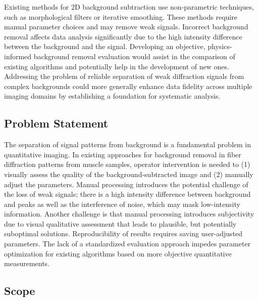 \documentclass[iucr,review]{iucrjournals}
\begin{document}
Existing methods for 2D background subtraction use non-parametric techniques,
such as morphological filters or iterative smoothing.
These methods require manual parameter choices and may remove weak signals.
Incorrect background removal affects data analysis significantly due
to the high intensity difference between the background and the signal.
Developing an objective, physics-informed background removal evaluation would assist
in the comparison of existing algorithms and potentially help in the development of new ones.
Addressing the problem of reliable separation of weak diffraction signals
from complex backgrounds could more generally enhance data fidelity
across multiple imaging domains by establishing a foundation for systematic analysis.

\subsection{Problem Statement}
The separation of signal patterns from background is a fundamental problem in quantitative imaging.
In existing approaches for background removal in fiber diffraction patterns from muscle samples, operator intervention is needed to (1)
visually assess the quality of the background-subtracted image and
(2) manually adjust the parameters. 
Manual processing introduces the potential challenge of the loss of weak signals; there is a high intensity difference between background and peaks
as well as the interference of noise, which may mask low-intensity information.
Another challenge is that manual processing introduces subjectivity due to visual qualitative assessment that leads to plausible,
but potentially suboptimal solutions. Reproducibility of results requires saving user-adjusted parameters.
The lack of a standardized evaluation approach impedes parameter optimization for existing algorithms based on more objective quantitative measurements.

\subsection{Scope}
\end{document}
